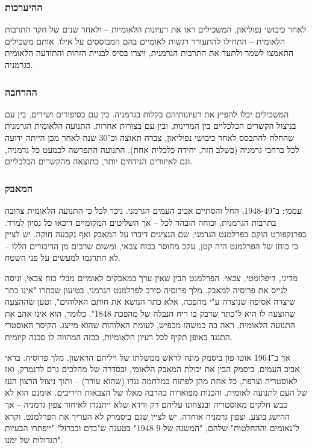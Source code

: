 \documentclass[]{article}
\begin{document}
	\subsubsection{ההיערכות}
	לאחר כיבושי נפוליאון, המשכילים ראו את רעיונות הלאומיות – ולאחר שנים של חקר התרבות הלאומית – התחילו להתעורר רגשות לאומיים בהם המבוססים על אילו. אותם משכילים התאמצו לשמר ולתעד את התרבות הגרמנית, ויצרו בסיס לבניית הזהות והתודעה הלאומית  בגרמניה. 
	
	\subsubsection{ההרחבה}
	המשכילים יכלו להפיץ את רעיונותיהם בקלות בגרמניה. בין עם בסיפורים ושירים, בין עם בניצול הקשרים הכלכליים בין המדינות, ובין עם בצורות אחרות. התנועה הלאומית הגרמנית שהחלה להתבסס לאחר כיבושי נפוליאון, צברה תאוצה וכ־30 שנה לאחר מכן הייתה ידועה לכל ברחבי גרמניה (בשלב הזה, יחידה כלכלית אחת). התנועה התפרשה לכמעט כל גרמניה, וגם לאיזורים הנידחים יותר, כתוצאה מהקשרים  הכלכליים.
	\subsubsection{המאבק}
	\textit{עממי}: ב־1948-49, החל והסתיים אביב העמים הגרמני. ניכר לכל כי התנועה הלאומית צרובה בתרבות הגרמנית, וכוחה הובהר לכל – אך השליטים המקומיים דיכאו כל נסיון למרד. בפרנקפורט הוקם בפרלמנט הגרמני, שם הנציגים דיברו על המאבק ואף נקבעה חוקה. יש לציין כי כוחו של הפרלמנט היה קטן, עקב מחוסר בכוח צבאי, ומשום שרבים מן הדיבורים הללו – לא התרגמו למעשים על פני השטח. 
	
	\textit{מדיני, דיפלומטי, צבאי: }הפרלמנט הבין שאין ערך במאבקים לאומיים מבלי כוח צבאי, וניסה לגייס את פרוסיה למאבק. מלך פרוסיה סירב לפרלמנט הגרמני, בטיעון שכתרו "אינו כתר שיצרה אסיפה שנוצרה ע"י מהפכה, אלא כתר הנושא את חותם האלוהים", וטען שההצעה שהוצעה לו היא ל"כתר שדבק בו ריח הנבלה של מהפכת 1848". כלומר, הוא אינו אהב את התנועה הלאומית, ראה בה כמשהו מכפיש, לעומת האלוהות שהוא מייצג. הקיסר האוסטרי התנגד באופן תקיף לכל רעיון הלאומיות, ככזה המהווה לו סכנה קיומית. 
	
	אך ב־1964 אוטו פון ביסמק מונה לראש ממשלתו של ויליהם הראשון, מלך פרוסיה. בראי אביב העמים, ביסמק הבין את יכולת המאבק הלאומי, ובסדרה של מהלכים גרם לדנמרק, ואז לאוסטריה וצרפת, כל אחת מהן לפתוח במלחמה נגדו (שהוא עורר) – ותוך ניצול הרצון העז של העם לתנועה לאומית, והכנות מפוארות בהרבה מאלו של הצבאות היריבים. אומנם הוא לא כבש חלקים מאוסטריה ובנצחונו עליהם רק ווידא שלא ייתנגדו לאיחוד צפון גרמניה – אך ההישג בוצע, וצפון גרמניה אוחדה. יש לציין שגם ביסמרק לא העריך את הפרלמנט, וקרא ל"נאומים וההחלטות" שלהם, "המשגה של 1948-9" בטענה ש"בדם ובברזל" "ייפתרו הבעיות הגדולות של ימנו". 
\end{document}
